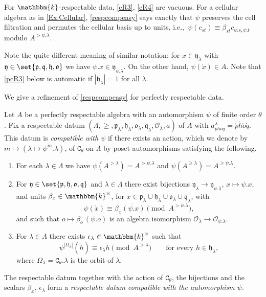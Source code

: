 \documentclass[a4paper,11pt]{amsart}
\numberwithin{equation}{subsection}
\theoremstyle{definition}
\theoremstyle{theorem}
\theoremstyle{remark}
\newcommand\CO{\mathcal{O}}
\newcommand\plam[1][\lambda]{\mathfrak{p}_{#1}}
\newcommand\hlam[1][\lambda]{\mathfrak{h}_{#1}}
\newcommand\qlam[1][\lambda]{\mathfrak{q}_{#1}}
\newcommand\Olam[1][\lambda]{\CO_{#1}}
\newcommand\olam[1][\lambda]{\mathfrak{o}_{#1}}
\newcommand\kk{\mathbbm{k}}
\begin{document}
\begin{Remark}
For $\kk$-respectable
data, \autoref{cR3}, \autoref{cR4} are vacuous. For a cellular algebra as in \autoref{Ex:Cellular}, \autoref{respcompeasy} says exactly
that $\psi$ preserves the cell filtration and permutes the cellular basis up to
units, i.e.,\ $\psi(c_{st})\equiv\beta_{st}c_{\psi.s,\psi.t}$ modulo
$A^{>\psi.\lambda}$.
\end{Remark}

\begin{Remark}\label{cardh1}
  Note the quite different meaning of similar notation: for  $x\in\mathfrak y_\lambda$ with
  $\mathfrak y\in\set{\mathfrak p,\mathfrak q,\mathfrak h,\mathfrak o}$ we have
  $\psi.x\in\mathfrak y_{\psi.\lambda}$. On the other hand, $\psi(\dot x)\in A$.  Note that \autoref{pcR3} below is automatic if $|\hlam|=1$ for all $\lambda$.
\end{Remark}
We give a refinement of \autoref{respcompeasy} for perfectly respectable data.

\begin{Definition}\label{respcompatible}
Let $A$ be a perfectly respectable algebra with an automorphism $\psi$ of finite order $\theta$. Fix a respectable datum
$(\Lambda, \ge, \mathfrak p_\lambda,\mathfrak h_\lambda,\mathfrak o_\lambda,\mathfrak q_\lambda, \Olam,a)$ of $A$ with $a^\lambda_{phoq}=\dot p\dot h\dot o\dot q$.   This datum is \emph{compatible with $\psi$} if  there exists an action,  which we denote by
$m\mapsto(\lambda\mapsto\psi^{m}.\lambda)$,  of $\mathtt{C}_\theta$ on $\Lambda$
by poset automorphisms satisfying the following.
  \begin{enumerate}[label=\upshape(pcR\arabic*), ref=\upshape(pcR\arabic*)]
    \item\label{pcR1} For each $\lambda\in\Lambda$ we have
      $\psi(A^{>\lambda})=A^{>\psi.\lambda}$ and
      $\psi(A^{\ge\lambda})=A^{\ge\psi.\lambda}$.
    \item\label{pcR2} For $\mathfrak y\in\set{\mathfrak p,\mathfrak h,\mathfrak o,\mathfrak q}$
      and $\lambda\in\Lambda$ there exist  bijections $\mathfrak y_\lambda\to\mathfrak y_{\psi.\lambda}$,
          $x\mapsto\psi.x$, and units $\beta_x\in\kk^{\times}$, for
          $x\in\plam\cup\hlam\cup\olam\cup\qlam$, with      \[
            \psi(\dot x)\equiv\beta_x\dot{(\psi.x)}\pmod{A^{>\psi.\lambda}},
          \]
      and such that $o\mapsto\beta_o\,(\psi.o)$ is an algebra isomorphism
      $\Olam\to\Olam[\psi.\lambda]$.
    \item \label{pcR3} For $\lambda\in\Lambda$ there exists $\epsilon_\lambda\in\kk^{\times}$
      such that
      \[
        \psi^{|\Omega_\lambda|}(\dot h)\equiv\epsilon_\lambda\dot h\pmod{A^{>\lambda}}
        \qquad\text{for every }h\in\hlam,
      \]
      where $\Omega_\lambda=\mathtt{C}_\theta.\lambda$ is the orbit of $\lambda$.
  \end{enumerate}
  The respectable datum together with the action of $\mathtt{C}_\theta$, the bijections and the scalars $\beta_x$, $\epsilon_\lambda$ form a \emph{respectable datum compatible with the automorphism $\psi$}.
\end{Definition}
\end{document}
